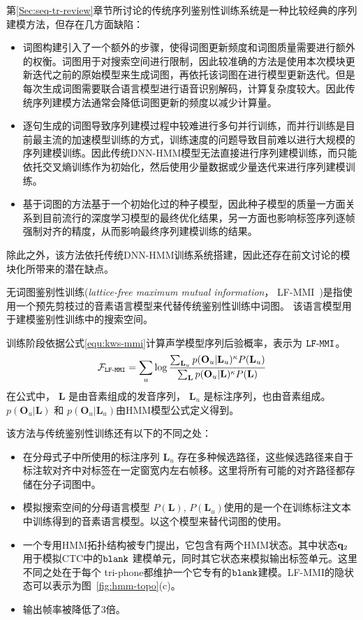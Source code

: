 第\ref{Sec:seq-tr-review}章节所讨论的传统序列鉴别性训练系统是一种比较经典的序列建模方法，但存在几方面缺陷：
\begin{itemize}
\item 词图构建引入了一个额外的步骤，使得词图更新频度和词图质量需要进行额外的权衡。词图用于对搜索空间进行限制，因此较准确的方法是使用本次模块更新迭代之前的原始模型来生成词图，再依托该词图在进行模型更新迭代。但是每次生成词图需要联合语言模型进行语音识别解码，计算复杂度较大。因此传统序列建模方法通常会降低词图更新的频度以减少计算量。
\item 逐句生成的词图导致序列建模过程中较难进行多句并行训练，而并行训练是目前最主流的加速模型训练的方式，训练速度的问题导致目前难以进行大规模的序列建模训练。因此传统DNN-HMM模型无法直接进行序列建模训练，而只能依托交叉熵训练作为初始化，然后使用少量数据或少量迭代来进行序列建模训练。
\item 基于词图的方法基于一个初始化过的种子模型，因此种子模型的质量一方面关系到目前流行的深度学习模型的最终优化结果，另一方面也影响标签序列逐帧强制对齐的精度，从而影响最终序列建模训练的结果。
\end{itemize}
除此之外，该方法依托传统DNN-HMM训练系统搭建，因此还存在前文讨论的模块化所带来的潜在缺点。


无词图鉴别性训练({\em lattice-free maximum mutual information}， LF-MMI~\cite{povey2016purely,chen2006advances})是指使用一个预先剪枝过的音素语言模型来代替传统鉴别性训练中词图。
该语言模型用于建模鉴别性训练中的搜索空间。

训练阶段依据公式\ref{equ:kws-mmi}计算声学模型序列后验概率，表示为 $\tt{LF\text{-}MMI}$。
\begin{equation}
\label{equ:kws-mmi}
\begin{split}
\mathcal{F}_{\tt{LF\text{-}MMI}}
=\sum_{u} \log \frac {\sum_{\mathbf{L}_u} p(\mathbf{O}_u|\mathbf{L}_u)^{\kappa}P(\mathbf{L}_u)}{\sum_{\mathbf{L}} p(\mathbf{O}_u|\mathbf{L})^{\kappa}P(\mathbf{L})}  
\end{split}
\end{equation}
在公式中， $\mathbf{L}$ 是由音素组成的发音序列， $\mathbf{L}_u$ 是标注序列，也由音素组成。
$p(\mathbf{O}_u|\mathbf{L})$ 和 $p(\mathbf{O}_u|\mathbf{L}_u)$由HMM模型公式定义得到。 


该方法与传统鉴别性训练还有以下的不同之处：
\begin{itemize}
\item 在分母式子中所使用的标注序列 $\mathbf{L}_u$ 存在多种候选路径，这些候选路径来自于标注软对齐中对标签在一定窗宽内左右帧移。这里将所有可能的对齐路径都存储在分子词图中。
\item 模拟搜索空间的分母语言模型 $P(\mathbf{L})$, $P(\mathbf{L}_u)$使用的是一个在训练标注文本中训练得到的音素语言模型。以这个模型来替代词图的使用。
\item 一个专用HMM拓扑结构被专门提出，它包含有两个HMM状态。其中状态${\bf q}_2$ 用于模拟CTC中的$\tt blank$ 建模单元，同时其它状态来模拟输出标签单元。这里不同之处在于每个 tri-phone都维护一个它专有的$\tt blank$建模。LF-MMI的隐状态可以表示为图~\ref{fig:hmm-topo}(c)。
\item 输出帧率被降低了3倍。
\end{itemize}

